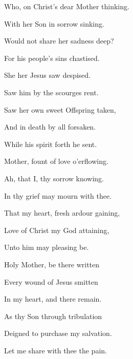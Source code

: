 \begin{multicols}{2}
\begin{hangparas}{1.25em}{1}
Who, on Christ's dear Mother thinking.

With her Son in sorrow sinking.

Would not share her sadness deep?%

\vspace{0.75\baselineskip}

For his people's sins chastised.

She her Jesus saw despised.

Saw him by the scourges rent.%

\vspace{0.75\baselineskip}

Saw her own sweet Offspring taken,

And in death by all forsaken.

While his spirit forth he sent.%

\vspace{0.75\baselineskip}

Mother, fount of love o'erflowing.

Ah, that I, thy sorrow knowing.

In thy grief may mourn with thee.%

\vspace{0.75\baselineskip}

That my heart, fresh ardour gaining,

Love of Christ my God attaining,

Unto him may pleasing be.%

\vspace{0.75\baselineskip}

Holy Mother, be there written

Every wound of Jesus smitten

In my heart, and there remain.%

\vspace{0.75\baselineskip}

As thy Son through tribulation

Deigned to purchase my salvation.

Let me share with thee the pain.%


\end{hangparas}
\end{multicols}
